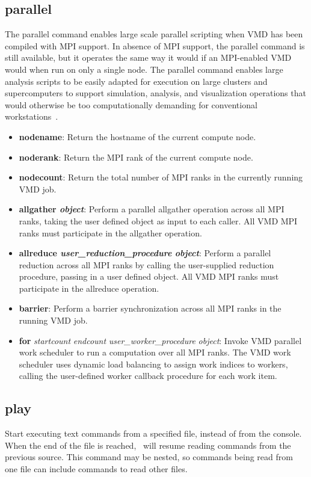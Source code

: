 \subsection{parallel}
  The parallel command enables large scale parallel 
scripting when VMD has been compiled with MPI support.
In absence of MPI support, the parallel command is still
available, but it operates the same way it would if an 
MPI-enabled VMD would when run on only a single node.
The parallel command enables large analysis scripts to be
easily adapted for execution on large clusters and supercomputers
to support simulation, analysis, and visualization operations that
would otherwise be too computationally demanding for conventional
workstations~\cite{STON2013,STON2013A,STON2014,PHIL2014}.

\begin{itemize}
  \item {\bf nodename}: Return the hostname of the current compute node.
  \item {\bf noderank}: Return the MPI rank of the current compute node.
  \item {\bf nodecount}: Return the total number of MPI ranks in the 
        currently running VMD job.
  \item {\bf allgather {\it object}}:
        Perform a parallel allgather operation across all MPI ranks,
        taking the user defined object as input to each caller.
        All VMD MPI ranks must participate in the allgather operation.
  \item {\bf allreduce {\it user\_reduction\_procedure} {\it object}}:
        Perform a parallel reduction across all MPI ranks by calling
        the user-supplied reduction procedure, passing in a user defined
        object. 
        All VMD MPI ranks must participate in the allreduce operation.
  \item {\bf barrier}: Perform a barrier synchronization across all
        MPI ranks in the running VMD job.
  \item {\bf for} {\it startcount} {\it endcount} {\it user\_worker\_procedure} {\it object}:
        Invoke VMD parallel work scheduler to run a computation over 
        all MPI ranks.  The VMD work scheduler uses dynamic load balancing
        to assign work indices to workers, calling the user-defined 
        worker callback procedure for each work item.  
\end{itemize}


\subsection{play}
Start executing text commands from a specified file, instead of from the 
console.  When the end of the file is
reached, \VMD\ will resume reading commands from the previous source.  This
command may be nested, so commands being read from one file can include
commands to read other files.


